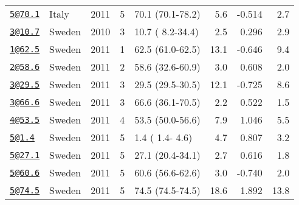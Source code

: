 \documentclass[]{article}
\begin{document}
\begin{longtable}[]{@{}llrrlrrr@{}}
\href{mailto:5@70.1}{\nolinkurl{5@70.1}} & Italy & 2011 & 5 & 70.1 (70.1-78.2) & 5.6 & -0.514 & 2.7\tabularnewline
\href{mailto:3@10.7}{\nolinkurl{3@10.7}} & Sweden & 2010 & 3 & 10.7 ( 8.2-34.4) & 2.5 & 0.296 & 2.9\tabularnewline
\href{mailto:1@62.5}{\nolinkurl{1@62.5}} & Sweden & 2011 & 1 & 62.5 (61.0-62.5) & 13.1 & -0.646 & 9.4\tabularnewline
\href{mailto:2@58.6}{\nolinkurl{2@58.6}} & Sweden & 2011 & 2 & 58.6 (32.6-60.9) & 3.0 & 0.608 & 2.0\tabularnewline
\href{mailto:3@29.5}{\nolinkurl{3@29.5}} & Sweden & 2011 & 3 & 29.5 (29.5-30.5) & 12.1 & -0.725 & 8.6\tabularnewline
\href{mailto:3@66.6}{\nolinkurl{3@66.6}} & Sweden & 2011 & 3 & 66.6 (36.1-70.5) & 2.2 & 0.522 & 1.5\tabularnewline
\href{mailto:4@53.5}{\nolinkurl{4@53.5}} & Sweden & 2011 & 4 & 53.5 (50.0-56.6) & 7.9 & 1.046 & 5.5\tabularnewline
\href{mailto:5@1.4}{\nolinkurl{5@1.4}} & Sweden & 2011 & 5 & 1.4 ( 1.4- 4.6) & 4.7 & 0.807 & 3.2\tabularnewline
\href{mailto:5@27.1}{\nolinkurl{5@27.1}} & Sweden & 2011 & 5 & 27.1 (20.4-34.1) & 2.7 & 0.616 & 1.8\tabularnewline
\href{mailto:5@60.6}{\nolinkurl{5@60.6}} & Sweden & 2011 & 5 & 60.6 (56.6-62.6) & 3.0 & -0.740 & 2.0\tabularnewline
\href{mailto:5@74.5}{\nolinkurl{5@74.5}} & Sweden & 2011 & 5 & 74.5 (74.5-74.5) & 18.6 & 1.892 & 13.8\tabularnewline
\bottomrule
\end{longtable}

\newpage
\end{document}
